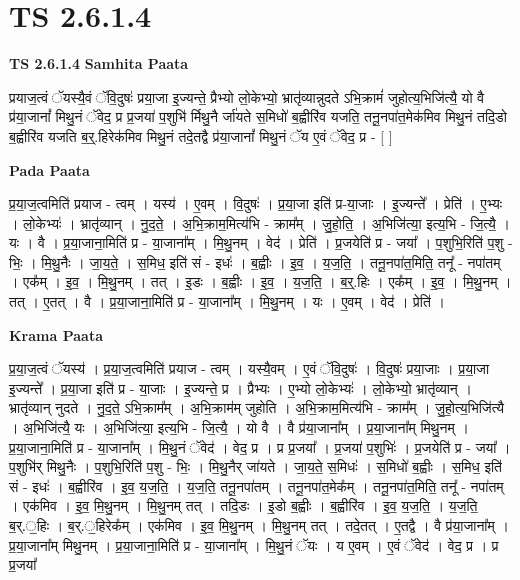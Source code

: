\documentclass[17pt]{extarticle}
\begin{document}
\section{ TS 2.6.1.4 }

\textbf{TS 2.6.1.4 } \newline
\textbf{Samhita Paata} \newline

प्रयाज॒त्वं ॅयस्यै॒वं ॅवि॒दुषः॑ प्रया॒जा इ॒ज्यन्ते॒ प्रैभ्यो लो॒केभ्यो॒ भ्रातृ॑व्यान्नुदते ऽभि॒क्रामं॑ जुहोत्य॒भिजि॑त्यै॒ यो वै प्र॑या॒जानां᳚ मिथु॒नं ॅवेद॒ प्र प्र॒जया॑ प॒शुभि॑ र्मिथु॒नै र्जा॑यते स॒मिधो॑ ब॒ह्वीरि॑व यजति॒ तनू॒नपा॑त॒मेक॑मिव मिथु॒नं तदि॒डो ब॒ह्वीरि॑व यजति ब॒र्॒.हिरेक॑मिव मिथु॒नं तदे॒तद्वै प्र॑या॒जानां᳚ मिथु॒नं ॅय ए॒वं ॅवेद॒ प्र - [  ] \newline

\textbf{Pada Paata} \newline

प्र॒या॒ज॒त्वमिति॑ प्रयाज - त्वम् । यस्य॑ । ए॒वम् । वि॒दुषः॑ । प्र॒या॒जा इति॑ प्र-या॒जाः । इ॒ज्यन्ते᳚ । प्रेति॑ । ए॒भ्यः । लो॒केभ्यः॑ । भ्रातृ॑व्यान् । नु॒द॒ते॒ । अ॒भि॒क्राम॒मित्य॑भि - क्राम᳚म् । जु॒हो॒ति॒ । अ॒भिजि॑त्या॒ इत्य॒भि - जि॒त्यै॒ । यः । वै । प्र॒या॒जाना॒मिति॑ प्र - या॒जाना᳚म् । मि॒थु॒नम् । वेद॑ । प्रेति॑ । प्र॒जयेति॑ प्र - जया᳚ । प॒शुभि॒रिति॑ प॒शु - भिः॒ । मि॒थु॒नैः । जा॒य॒ते॒ । स॒मिध॒ इति॑ सं - इधः॑ । ब॒ह्वीः । इ॒व॒ । य॒ज॒ति॒ । तनू॒नपा॑त॒मिति॒ तनू᳚ - नपा॑तम् । एक᳚म् । इ॒व॒ । मि॒थु॒नम् । तत् । इ॒डः । ब॒ह्वीः । इ॒व॒ । य॒ज॒ति॒ । ब॒र्॒.हिः । एक᳚म् । इ॒व॒ । मि॒थु॒नम् । तत् । ए॒तत् । वै । प्र॒या॒जाना॒मिति॑ प्र - या॒जाना᳚म् । मि॒थु॒नम् । यः । ए॒वम् । वेद॑ । प्रेति॑ ।  \newline


\textbf{Krama Paata} \newline

प्र॒या॒ज॒त्वं ॅयस्य॑ । प्र॒या॒ज॒त्वमिति॑ प्रयाज - त्वम् । यस्यै॒वम् । ए॒वं ॅवि॒दुषः॑ । वि॒दुषः॑ प्रया॒जाः । प्र॒या॒जा इ॒ज्यन्ते᳚ । प्र॒या॒जा इति॑ प्र - या॒जाः । इ॒ज्यन्ते॒ प्र । प्रैभ्यः । ए॒भ्यो लो॒केभ्यः॑ । लो॒केभ्यो॒ भ्रातृ॑व्यान् । भ्रातृ॑व्यान् नुदते । नु॒द॒ते॒ ऽभि॒क्राम᳚म् । अ॒भि॒क्राम॑म् जुहोति । अ॒भि॒क्राम॒मित्य॑भि - क्राम᳚म् । जु॒हो॒त्य॒भिजि॑त्यै । अ॒भिजि॑त्यै॒ यः । अ॒भिजि॑त्या॒ इत्य॒भि - जि॒त्यै॒ । यो वै । वै प्र॑या॒जाना᳚म् । प्र॒या॒जाना᳚म् मिथु॒नम् । प्र॒या॒जाना॒मिति॑ प्र - या॒जाना᳚म् । मि॒थु॒नं ॅवेद॑ । वेद॒ प्र । प्र प्र॒जया᳚ । प्र॒जया॑ प॒शुभिः॑ । प्र॒जयेति॑ प्र - जया᳚ । प॒शुभि॑र् मिथु॒नैः । प॒शुभि॒रिति॑ प॒शु - भिः॒ । मि॒थु॒नैर् जा॑यते । जा॒य॒ते॒ स॒मिधः॑ । स॒मिधो॑ ब॒ह्वीः । स॒मिध॒ इति॑ सं - इधः॑ । ब॒ह्वीरि॑व । इ॒व॒ य॒ज॒ति॒ । य॒ज॒ति॒ तनू॒नपा॑तम् । तनू॒नपा॑त॒मेक᳚म् । तनू॒नपा॑त॒मिति॒ तनू᳚ - नपा॑तम् । एक॑मिव । इ॒व॒ मि॒थु॒नम् । मि॒थु॒नम् तत् । तदि॒डः । इ॒डो ब॒ह्वीः । ब॒ह्वीरि॑व । इ॒व॒ य॒ज॒ति॒ । य॒ज॒ति॒ ब॒र्.॒हिः । ब॒र्.॒हिरेक᳚म् । एक॑मिव । इ॒व॒ मि॒थु॒नम् । मि॒थु॒नम् तत् । तदे॒तत् । ए॒तद्वै । वै प्र॑या॒जाना᳚म् । प्र॒या॒जाना᳚म् मिथु॒नम् । प्र॒या॒जाना॒मिति॑ प्र - या॒जाना᳚म् । मि॒थु॒नं ॅयः । य ए॒वम् । ए॒वं ॅवेद॑ । वेद॒ प्र । प्र प्र॒जया᳚ \newline
\end{document}

